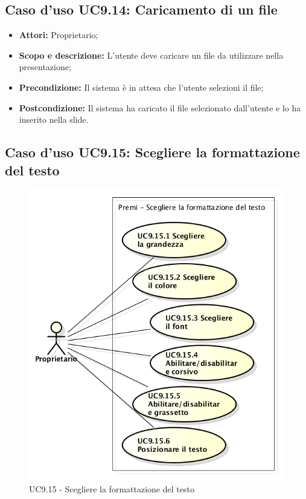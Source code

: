 \subsection{Caso d'uso UC9.14: Caricamento di un file}
\begin{itemize}
	\item \textbf{Attori:} Proprietario;
	\item \textbf{Scopo e descrizione:} L'utente deve caricare un file da utilizzare nella presentazione;
	\item \textbf{Precondizione:} Il sistema è in attesa che l'utente selezioni il file;
	\item \textbf{Postcondizione:} Il sistema ha caricato il file selezionato dall'utente e lo ha inserito nella slide.
\end{itemize}


\subsection{Caso d'uso UC9.15: Scegliere la formattazione del testo}
\begin{figure}[h] 
	\centering 
	\includegraphics[scale=0.45] {img/UC9.15.png} 
	\caption{UC9.15 - Scegliere la formattazione del testo}
\end{figure}

